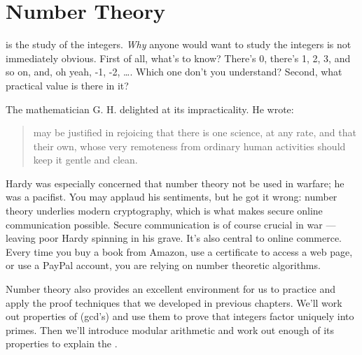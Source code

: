 \chapter{Number Theory}\label{number_theory_chap}

 is the study of the integers.  \emph{Why} anyone
would want to study the integers is not immediately obvious.  First of
all, what's to know?  There's 0, there's 1, 2, 3, and so on, and, oh
yeah, -1, -2, \dots.  Which one don't you understand?  Second, what
practical value is there in it?

\iffalse Number theory is at the core of mathematics; even Ug the
Caveman surely had some grasp of the integers ---at least the positive
ones.  In fact, the integers are so elementary that one might ask,
``What's to study?''  There's 0, there's 1, 2, 3 and so on, and
there's the negatives.  Which one don't you understand?  Doesn't math
become easy when we don't have to worry about nasty numbers like
$\sqrt{7}$, $1 / \pi$, and $i$?  We can even forget about fractions!
\fi

The mathematician G. H.  delighted at its impracticality.  He wrote:

 \begin{quotation}
  may be justified in rejoicing that there
 is one science, at any rate, and that their own, whose very
 remoteness from ordinary human activities should keep it gentle and
 clean.
 \end{quotation}

Hardy was especially concerned that number theory not be used in
warfare; he was a pacifist.  You may applaud his sentiments, but he
got it wrong: number theory underlies modern cryptography, which is
what makes secure online communication possible.  Secure communication
is of course crucial in war ---leaving poor Hardy spinning in
his grave.  It's also central to online commerce.  Every time you buy
a book from Amazon, use a certificate to access a web page, or use a
PayPal account, you are relying on number theoretic algorithms.

Number theory also provides an excellent environment for us to
practice and apply the proof techniques that we developed in previous
chapters.  We'll work out properties of 
(gcd's) and use them to prove that integers factor uniquely into
primes.  Then we'll introduce modular arithmetic and work out enough
of its properties to explain the .

